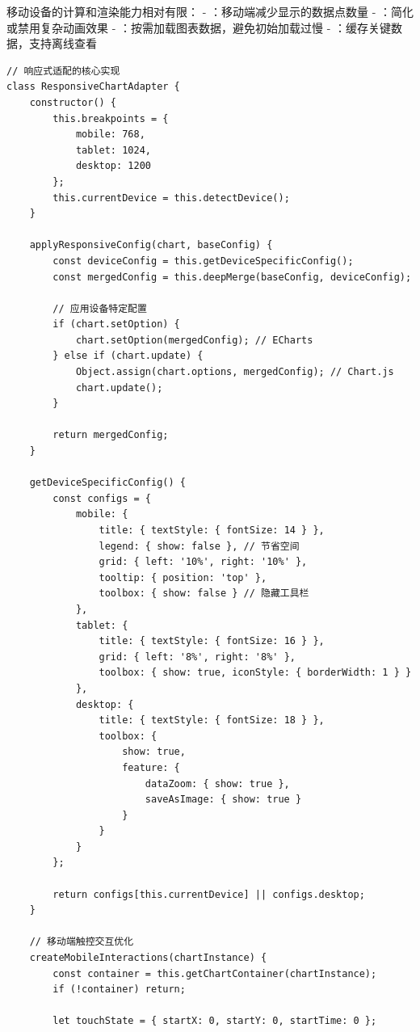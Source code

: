 移动设备的计算和渲染能力相对有限： - ：移动端减少显示的数据点数量 - ：简化或禁用复杂动画效果 - ：按需加载图表数据，避免初始加载过慢 - ：缓存关键数据，支持离线查看

\begin{lstlisting}[style=javascript]
// 响应式适配的核心实现
class ResponsiveChartAdapter {
    constructor() {
        this.breakpoints = {
            mobile: 768,
            tablet: 1024,
            desktop: 1200
        };
        this.currentDevice = this.detectDevice();
    }
    
    applyResponsiveConfig(chart, baseConfig) {
        const deviceConfig = this.getDeviceSpecificConfig();
        const mergedConfig = this.deepMerge(baseConfig, deviceConfig);
        
        // 应用设备特定配置
        if (chart.setOption) {
            chart.setOption(mergedConfig); // ECharts
        } else if (chart.update) {
            Object.assign(chart.options, mergedConfig); // Chart.js
            chart.update();
        }
        
        return mergedConfig;
    }
    
    getDeviceSpecificConfig() {
        const configs = {
            mobile: {
                title: { textStyle: { fontSize: 14 } },
                legend: { show: false }, // 节省空间
                grid: { left: '10%', right: '10%' },
                tooltip: { position: 'top' },
                toolbox: { show: false } // 隐藏工具栏
            },
            tablet: {
                title: { textStyle: { fontSize: 16 } },
                grid: { left: '8%', right: '8%' },
                toolbox: { show: true, iconStyle: { borderWidth: 1 } }
            },
            desktop: {
                title: { textStyle: { fontSize: 18 } },
                toolbox: {
                    show: true,
                    feature: {
                        dataZoom: { show: true },
                        saveAsImage: { show: true }
                    }
                }
            }
        };
        
        return configs[this.currentDevice] || configs.desktop;
    }
    
    // 移动端触控交互优化
    createMobileInteractions(chartInstance) {
        const container = this.getChartContainer(chartInstance);
        if (!container) return;
        
        let touchState = { startX: 0, startY: 0, startTime: 0 };
        

\end{lstlisting}
